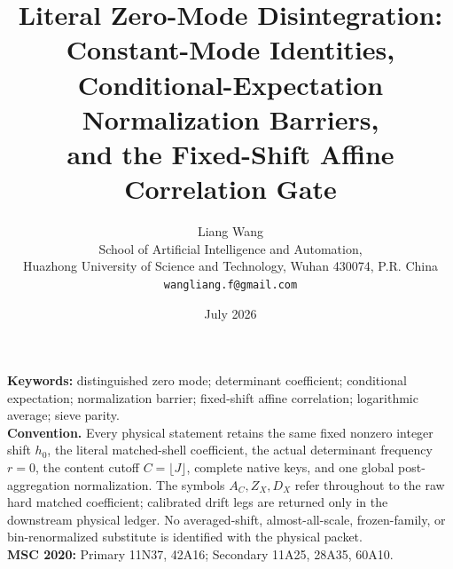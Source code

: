 \documentclass[11pt]{article}
\title{Literal Zero-Mode Disintegration:\\
Constant-Mode Identities, Conditional-Expectation Normalization
Barriers,\\
and the Fixed-Shift Affine Correlation Gate}
\author{Liang Wang\\
School of Artificial Intelligence and Automation,\\
Huazhong University of Science and Technology, Wuhan 430074, P.R. China\\
\texttt{wangliang.f@gmail.com}}
\date{July 2026}
\theoremstyle{remark}
\begin{document}
\maketitle


\noindent\textbf{Keywords:} distinguished zero mode; determinant
coefficient; conditional expectation; normalization barrier;
fixed-shift affine correlation; logarithmic average; sieve parity.\\[0.5em]
\noindent\textbf{Convention.} Every physical statement retains the
same fixed nonzero integer shift \(h_0\), the literal matched-shell
coefficient, the actual determinant frequency \(r=0\), the content
cutoff \(C=\lfloor J\rfloor\), complete native keys, and one global
post-aggregation normalization.  The symbols \(A_C,Z_X,D_X\) refer
throughout to the raw hard matched coefficient; calibrated drift legs
are returned only in the downstream physical ledger.  No
averaged-shift, almost-all-scale, frozen-family, or bin-renormalized
substitute is identified with the physical packet.\\[0.5em]
\noindent\textbf{MSC 2020:} Primary 11N37, 42A16; Secondary 11A25,
28A35, 60A10.












\begingroup
\footnotesize
\raggedright


\endgroup
\end{document}
